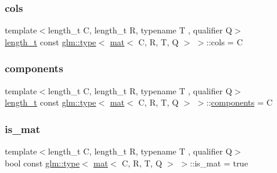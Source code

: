 \subsubsection{\texorpdfstring{cols}{cols}}
{\footnotesize\ttfamily template$<$length\+\_\+t C, length\+\_\+t R, typename T , qualifier Q$>$ \\
\hyperlink{namespaceglm_a090a0de2260835bee80e71a702492ed9}{length\+\_\+t} const \hyperlink{structglm_1_1type}{glm\+::type}$<$ \hyperlink{structglm_1_1mat}{mat}$<$ C, R, T, Q $>$ $>$\+::cols = C\hspace{0.3cm}{\ttfamily [static]}}

\mbox{\label{structglm_1_1type_3_01mat_3_01_c_00_01_r_00_01_t_00_01_q_01_4_01_4_a4f440364136d8fa3a62b2e1bfff81a01}} 
\subsubsection{\texorpdfstring{components}{components}}
{\footnotesize\ttfamily template$<$length\+\_\+t C, length\+\_\+t R, typename T , qualifier Q$>$ \\
\hyperlink{namespaceglm_a090a0de2260835bee80e71a702492ed9}{length\+\_\+t} const \hyperlink{structglm_1_1type}{glm\+::type}$<$ \hyperlink{structglm_1_1mat}{mat}$<$ C, R, T, Q $>$ $>$\+::\hyperlink{_s_d_l__opengl__glext_8h_a3824c86dfa50d23068c74eafb87375c2}{components} = C\hspace{0.3cm}{\ttfamily [static]}}

\mbox{\label{structglm_1_1type_3_01mat_3_01_c_00_01_r_00_01_t_00_01_q_01_4_01_4_a8fb529c47b93fcd9c446bb960d6e1fc9}} 
\subsubsection{\texorpdfstring{is\+\_\+mat}{is\_mat}}
{\footnotesize\ttfamily template$<$length\+\_\+t C, length\+\_\+t R, typename T , qualifier Q$>$ \\
bool const \hyperlink{structglm_1_1type}{glm\+::type}$<$ \hyperlink{structglm_1_1mat}{mat}$<$ C, R, T, Q $>$ $>$\+::is\+\_\+mat = true\hspace{0.3cm}{\ttfamily [static]}}

